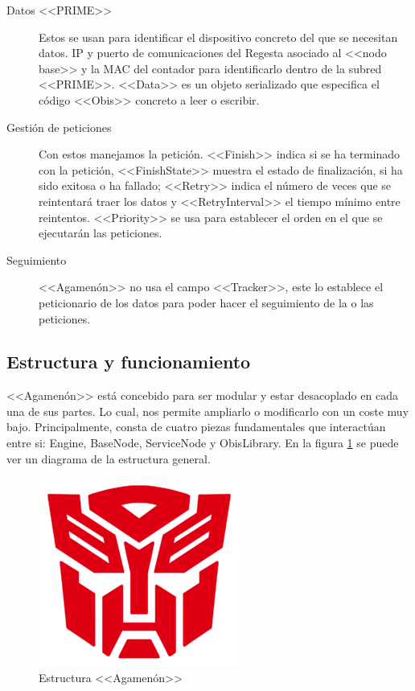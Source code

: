 \begin{description}
	\item[Datos <<PRIME>>] Estos se usan para identificar el dispositivo concreto del que se necesitan datos. IP y puerto de comunicaciones del Regesta asociado al <<nodo base>> y la MAC del contador para identificarlo dentro de la subred <<PRIME>>. <<Data>> es un objeto serializado que especifica el código <<Obis>> concreto a leer o escribir.
	\item[Gestión de peticiones] Con estos manejamos la petición. <<Finish>> indica si se ha terminado con la petición, <<FinishState>> muestra el estado de finalización, si ha sido exitosa o ha fallado; <<Retry>> indica el número de veces que se reintentará traer los datos y <<RetryInterval>> el tiempo mínimo entre reintentos. <<Priority>> se usa para establecer el orden en el que se ejecutarán las peticiones.
	\item[Seguimiento] <<Agamenón>> no usa el campo <<Tracker>>, este lo establece el peticionario de los datos para poder hacer el seguimiento de la o las peticiones.
\end{description}


\subsection{Estructura y funcionamiento}
<<Agamenón>> está concebido para ser modular y estar desacoplado en cada una de sus partes. Lo cual, nos permite ampliarlo o modificarlo con un coste muy bajo. Principalmente, consta de cuatro piezas fundamentales que interactúan entre si: Engine, BaseNode, ServiceNode y ObisLibrary. En la figura \ref{fig:EstructuraAgameon} se puede ver un diagrama de la estructura general.
\begin{figure}[htbp]
	\centering
	\includegraphics[width=\textwidth]{Img/dummy.png}
	\caption{Estructura <<Agamenón>>}
	\label{fig:EstructuraAgameon}
\end{figure}



